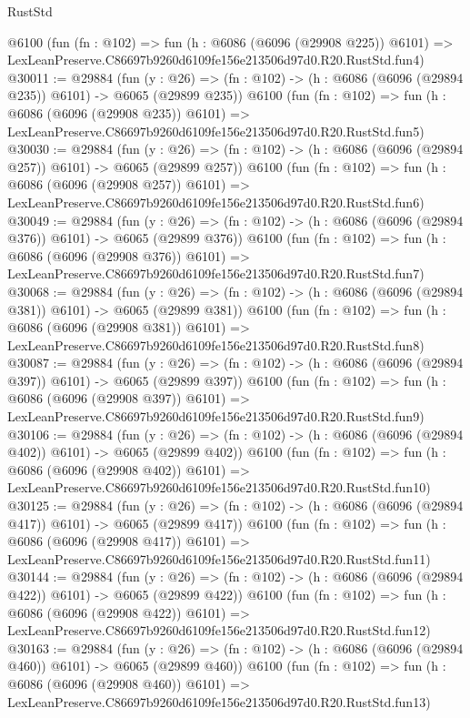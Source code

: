 \begin{lexlean}{RustStd}
\begin{coremodule}
    @6100
    (fun (fn : @102) =>
    fun (h : @6086 (@6096 (@29908 @225)) @6101) =>
    LexLeanPreserve.C86697b9260d6109fe156e213506d97d0.R20.RustStd.fun4)
@30011 := @29884
    (fun (y : @26) => (fn : @102) -> (h : @6086 (@6096 (@29894 @235)) @6101) -> @6065 (@29899 @235))
    @6100
    (fun (fn : @102) =>
    fun (h : @6086 (@6096 (@29908 @235)) @6101) =>
    LexLeanPreserve.C86697b9260d6109fe156e213506d97d0.R20.RustStd.fun5)
@30030 := @29884
    (fun (y : @26) => (fn : @102) -> (h : @6086 (@6096 (@29894 @257)) @6101) -> @6065 (@29899 @257))
    @6100
    (fun (fn : @102) =>
    fun (h : @6086 (@6096 (@29908 @257)) @6101) =>
    LexLeanPreserve.C86697b9260d6109fe156e213506d97d0.R20.RustStd.fun6)
@30049 := @29884
    (fun (y : @26) => (fn : @102) -> (h : @6086 (@6096 (@29894 @376)) @6101) -> @6065 (@29899 @376))
    @6100
    (fun (fn : @102) =>
    fun (h : @6086 (@6096 (@29908 @376)) @6101) =>
    LexLeanPreserve.C86697b9260d6109fe156e213506d97d0.R20.RustStd.fun7)
@30068 := @29884
    (fun (y : @26) => (fn : @102) -> (h : @6086 (@6096 (@29894 @381)) @6101) -> @6065 (@29899 @381))
    @6100
    (fun (fn : @102) =>
    fun (h : @6086 (@6096 (@29908 @381)) @6101) =>
    LexLeanPreserve.C86697b9260d6109fe156e213506d97d0.R20.RustStd.fun8)
@30087 := @29884
    (fun (y : @26) => (fn : @102) -> (h : @6086 (@6096 (@29894 @397)) @6101) -> @6065 (@29899 @397))
    @6100
    (fun (fn : @102) =>
    fun (h : @6086 (@6096 (@29908 @397)) @6101) =>
    LexLeanPreserve.C86697b9260d6109fe156e213506d97d0.R20.RustStd.fun9)
@30106 := @29884
    (fun (y : @26) => (fn : @102) -> (h : @6086 (@6096 (@29894 @402)) @6101) -> @6065 (@29899 @402))
    @6100
    (fun (fn : @102) =>
    fun (h : @6086 (@6096 (@29908 @402)) @6101) =>
    LexLeanPreserve.C86697b9260d6109fe156e213506d97d0.R20.RustStd.fun10)
@30125 := @29884
    (fun (y : @26) => (fn : @102) -> (h : @6086 (@6096 (@29894 @417)) @6101) -> @6065 (@29899 @417))
    @6100
    (fun (fn : @102) =>
    fun (h : @6086 (@6096 (@29908 @417)) @6101) =>
    LexLeanPreserve.C86697b9260d6109fe156e213506d97d0.R20.RustStd.fun11)
@30144 := @29884
    (fun (y : @26) => (fn : @102) -> (h : @6086 (@6096 (@29894 @422)) @6101) -> @6065 (@29899 @422))
    @6100
    (fun (fn : @102) =>
    fun (h : @6086 (@6096 (@29908 @422)) @6101) =>
    LexLeanPreserve.C86697b9260d6109fe156e213506d97d0.R20.RustStd.fun12)
@30163 := @29884
    (fun (y : @26) => (fn : @102) -> (h : @6086 (@6096 (@29894 @460)) @6101) -> @6065 (@29899 @460))
    @6100
    (fun (fn : @102) =>
    fun (h : @6086 (@6096 (@29908 @460)) @6101) =>
    LexLeanPreserve.C86697b9260d6109fe156e213506d97d0.R20.RustStd.fun13)

\end{coremodule}
\end{lexlean}
